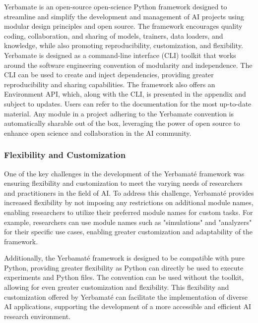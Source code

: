 Yerbamate is an open-source open-science Python framework designed to streamline and simplify the development and management of AI projects using modular design principles and open source. The framework encourages quality coding, collaboration, and sharing of models, trainers, data loaders, and knowledge, while also promoting reproducibility, customization, and flexibility. Yerbamate is designed as a command-line interface (CLI) toolkit that works around the software engineering convention of modularity and independence. The CLI can be used to create and inject dependencies, providing greater reproducibility and sharing capabilities. 
The framework also offers an Environment API, which, along with the CLI, is presented in the appendix and subject to updates. Users can refer to the documentation for the most up-to-date material. Any module in a project adhering to the Yerbamate convention is automatically sharable out of the box, leveraging the power of open source to enhance open science and collaboration in the AI community.

\subsubsection{Flexibility and Customization}

One of the key challenges in the development of the Yerbamaté framework was ensuring flexibility and customization to meet the varying needs of researchers and practitioners in the field of AI. To address this challenge, Yerbamaté provides increased flexibility by not imposing any restrictions on additional module names, enabling researchers to utilize their preferred module names for custom tasks. For example, researchers can use module names such as "simulations" and "analyzers" for their specific use cases, enabling greater customization and adaptability of the framework.

Additionally, the Yerbamaté framework is designed to be compatible with pure Python, providing greater flexibility as Python can directly be used to execute experiments and Python files. The convention can be used without the toolkit, allowing for even greater customization and flexibility. This flexibility and customization offered by Yerbamaté can facilitate the implementation of diverse AI applications, supporting the development of a more accessible and efficient AI research environment.

